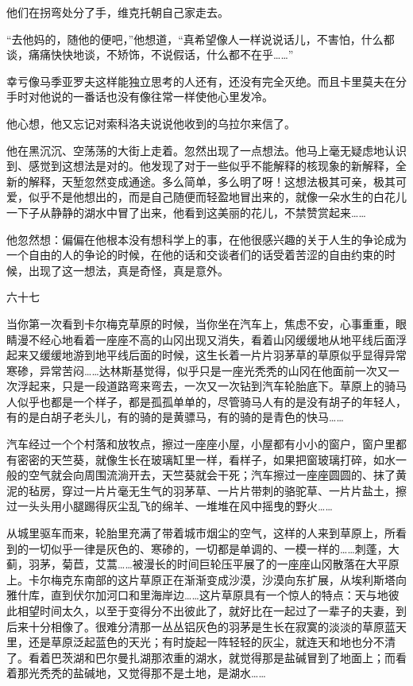 他们在拐弯处分了手，维克托朝自己家走去。

“去他妈的，随他的便吧，”他想道，“真希望像人一样说说话儿，不害怕，什么都谈，痛痛快快地谈，不矫饰，不说假话，什么都不在乎……”

幸亏像马季亚罗夫这样能独立思考的人还有，还没有完全灭绝。而且卡里莫夫在分手时对他说的一番话也没有像往常一样使他心里发冷。

他心想，他又忘记对索科洛夫说说他收到的乌拉尔来信了。

他在黑沉沉、空荡荡的大街上走着。忽然出现了一点想法。他马上毫无疑虑地认识到、感觉到这想法是对的。他发现了对于一些似乎不能解释的核现象的新解释，全新的解释，天堑忽然变成通途。多么简单，多么明了呀！这想法极其可亲，极其可爱，似乎不是他想出的，而是自己随便而轻盈地冒出来的，就像一朵水生的白花儿一下子从静静的湖水中冒了出来，他看到这美丽的花儿，不禁赞赏起来……

他忽然想：偏偏在他根本没有想科学上的事，在他很感兴趣的关于人生的争论成为一个自由的人的争论的时候，在他的话和交谈者们的话受着苦涩的自由约束的时候，出现了这一想法，真是奇怪，真是意外。

六十七

当你第一次看到卡尔梅克草原的时候，当你坐在汽车上，焦虑不安，心事重重，眼睛漫不经心地看着一座座不高的山冈出现又消失，看着山冈缓缓地从地平线后面浮起来又缓缓地游到地平线后面的时候，这生长着一片片羽茅草的草原似乎显得异常寒碜，异常苦闷……达林斯基觉得，似乎只是一座光秃秃的山冈在他面前一次又一次浮起来，只是一段道路弯来弯去，一次又一次钻到汽车轮胎底下。草原上的骑马人似乎也都是一个样子，都是孤孤单单的，尽管骑马人有的是没有胡子的年轻人，有的是白胡子老头儿，有的骑的是黄骠马，有的骑的是青色的快马……

汽车经过一个个村落和放牧点，擦过一座座小屋，小屋都有小小的窗户，窗户里都有密密的天竺葵，就像生长在玻璃缸里一样，看样子，如果把窗玻璃打碎，如水一般的空气就会向周围流淌开去，天竺葵就会干死；汽车擦过一座座圆圆的、抹了黄泥的毡房，穿过一片片毫无生气的羽茅草、一片片带刺的骆驼草、一片片盐土，擦过一头头用小腿踢得灰尘乱飞的绵羊、一堆堆在风中摇曳的野火……

从城里驱车而来，轮胎里充满了带着城市烟尘的空气，这样的人来到草原上，所看到的一切似乎一律是灰色的、寒碜的，一切都是单调的、一模一样的……刺蓬，大蓟，羽茅，菊苣，艾蒿……被漫长的时间巨轮压平展了的一座座山冈散落在大平原上。卡尔梅克东南部的这片草原正在渐渐变成沙漠，沙漠向东扩展，从埃利斯塔向雅什库，直到伏尔加河口和里海岸边……这片草原具有一个惊人的特点：天与地彼此相望时间太久，以至于变得分不出彼此了，就好比在一起过了一辈子的夫妻，到后来十分相像了。很难分清那一丛丛铝灰色的羽茅是生长在寂寞的淡淡的草原蓝天里，还是草原泛起蓝色的天光；有时旋起一阵轻轻的灰尘，就连天和地也分不清了。看着巴茨湖和巴尔曼扎湖那浓重的湖水，就觉得那是盐碱冒到了地面上；而看着那光秃秃的盐碱地，又觉得那不是土地，是湖水……

